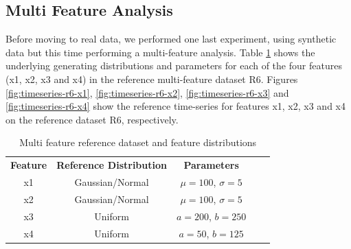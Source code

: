 \subsection{Multi Feature Analysis}
Before moving to real data, we performed one last experiment, using synthetic data but this time performing a multi-feature analysis. Table \ref{tbl:multi-feat-ref-dataset-distros} shows the underlying generating distributions and parameters for each of the four features (x1, x2, x3 and x4) in the reference multi-feature dataset R6. Figures \ref{fig:timeseries-r6-x1}, \ref{fig:timeseries-r6-x2}, \ref{fig:timeseries-r6-x3} and \ref{fig:timeseries-r6-x4} show the reference time-series for features x1, x2, x3 and x4 on the reference dataset R6, respectively.

\begin{table}[!htb]
    \begin{center}
        \begin{tabular}{|c|c|c|ll}
        \cline{1-3}
        \textbf{Feature} & \textbf{Reference Distribution} & \textbf{Parameters} &  &  \\ \cline{1-3}
        x1               & Gaussian/Normal                 & $\mu=100$, $\sigma=5$  &  &  \\ \cline{1-3}
        x2               & Gaussian/Normal                 & $\mu=100$, $\sigma=5$  &  &  \\ \cline{1-3}
        x3               & Uniform                         & $a=200$, $b=250$       &  &  \\ \cline{1-3}
        x4               & Uniform                         & $a=50$, $b=125$        &  &  \\ \cline{1-3}
        \end{tabular}
    \end{center}
    \caption{Multi feature reference dataset and feature distributions}
    \label{tbl:multi-feat-ref-dataset-distros}
\end{table}


